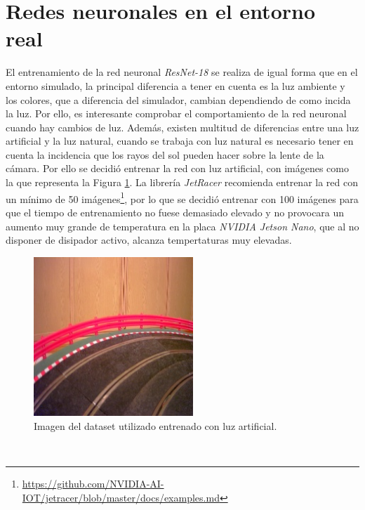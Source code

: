 \section{Redes neuronales en el entorno real}
El entrenamiento de la red neuronal \textit{ResNet-18} se realiza de igual forma que en el entorno simulado, la principal diferencia a tener en cuenta es la luz ambiente y los colores, que a diferencia del simulador, cambian dependiendo de como incida la luz. Por ello, es interesante comprobar el comportamiento de la red neuronal cuando hay cambios de luz. Además, existen multitud de diferencias entre una luz artificial y la luz natural, cuando se trabaja con luz natural es necesario tener en cuenta la incidencia que los rayos del sol pueden hacer sobre la lente de la cámara. Por ello se decidió entrenar la red con luz artificial, con imágenes como la que representa la Figura \ref{fig:imagedataset}. La librería \textit{JetRacer} recomienda entrenar la red con un mínimo de 50 imágenes\footnote{\url{https://github.com/NVIDIA-AI-IOT/jetracer/blob/master/docs/examples.md}}, por lo que se decidió entrenar con 100 imágenes para que el tiempo de entrenamiento no fuese demasiado elevado y no provocara un aumento muy grande de temperatura en la placa \textit{NVIDIA Jetson Nano}, que al no disponer de disipador activo, alcanza tempertaturas muy elevadas.\\

\begin{figure} [h!]
	\begin{center}
		\includegraphics[width=6cm]{figs/imagedataset}
	\end{center}
	\caption{Imagen del dataset utilizado entrenado con luz artificial.}
	\label{fig:imagedataset}
\end{figure}\


